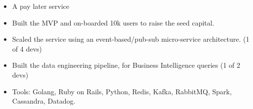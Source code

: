 \documentclass[11pt,a4paper,sans]{moderncv}
\begin{document}
{
    \begin{itemize}
    \item A pay later service
    \item Built the MVP and on-boarded 10k users to raise the seed capital.
    \item Scaled the service using an event-based/pub-sub micro-service
    architecture. (1 of 4 devs)
    \item Built the data engineering pipeline, for Business Intelligence queries
    (1 of 2 devs)
    \item Tools: Golang, Ruby on Rails, Python, Redis, Kafka, RabbitMQ, Spark,
    Cassandra, Datadog.
    \end{itemize}
}

\end{document}
